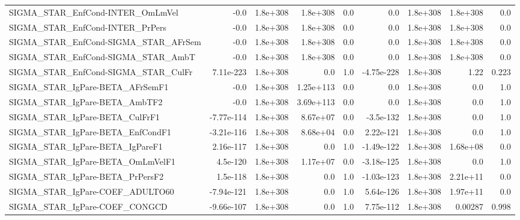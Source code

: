 \begin{tabular}{lrrrrrrrr}
SIGMA\_STAR\_EnfCond-INTER\_OmLmVel      &        -0.0 &     1.8e+308 &   1.8e+308 &      0.0 &        0.0 &    1.8e+308 &     1.8e+308 &           0.0 \\
SIGMA\_STAR\_EnfCond-INTER\_PrPers       &        -0.0 &     1.8e+308 &   1.8e+308 &      0.0 &        0.0 &    1.8e+308 &     1.8e+308 &           0.0 \\
SIGMA\_STAR\_EnfCond-SIGMA\_STAR\_AFrSem  &        -0.0 &     1.8e+308 &   1.8e+308 &      0.0 &        0.0 &    1.8e+308 &     1.8e+308 &           0.0 \\
SIGMA\_STAR\_EnfCond-SIGMA\_STAR\_AmbT    &        -0.0 &     1.8e+308 &   1.8e+308 &      0.0 &        0.0 &    1.8e+308 &     1.8e+308 &           0.0 \\
SIGMA\_STAR\_EnfCond-SIGMA\_STAR\_CulFr   &   7.11e-223 &     1.8e+308 &        0.0 &      1.0 & -4.75e-228 &    1.8e+308 &         1.22 &         0.223 \\
SIGMA\_STAR\_IgPare-BETA\_AFrSemF1       &        -0.0 &     1.8e+308 &  1.25e+113 &      0.0 &        0.0 &    1.8e+308 &          0.0 &           1.0 \\
SIGMA\_STAR\_IgPare-BETA\_AmbTF2         &        -0.0 &     1.8e+308 &  3.69e+113 &      0.0 &        0.0 &    1.8e+308 &          0.0 &           1.0 \\
SIGMA\_STAR\_IgPare-BETA\_CulFrF1        &  -7.77e-114 &     1.8e+308 &   8.67e+07 &      0.0 &  -3.5e-132 &    1.8e+308 &          0.0 &           1.0 \\
SIGMA\_STAR\_IgPare-BETA\_EnfCondF1      &  -3.21e-116 &     1.8e+308 &   8.68e+04 &      0.0 &  2.22e-121 &    1.8e+308 &          0.0 &           1.0 \\
SIGMA\_STAR\_IgPare-BETA\_IgPareF1       &   2.16e-117 &     1.8e+308 &        0.0 &      1.0 & -1.49e-122 &    1.8e+308 &     1.68e+08 &           0.0 \\
SIGMA\_STAR\_IgPare-BETA\_OmLmVelF1      &    4.5e-120 &     1.8e+308 &   1.17e+07 &      0.0 & -3.18e-125 &    1.8e+308 &          0.0 &           1.0 \\
SIGMA\_STAR\_IgPare-BETA\_PrPersF2       &    1.5e-118 &     1.8e+308 &        0.0 &      1.0 & -1.03e-123 &    1.8e+308 &     2.21e+11 &           0.0 \\
SIGMA\_STAR\_IgPare-COEF\_ADULTO60       &  -7.94e-121 &     1.8e+308 &        0.0 &      1.0 &  5.64e-126 &    1.8e+308 &     1.97e+11 &           0.0 \\
SIGMA\_STAR\_IgPare-COEF\_CONGCD         &  -9.66e-107 &     1.8e+308 &        0.0 &      1.0 &  7.75e-112 &    1.8e+308 &      0.00287 &         0.998 \\

\end{tabular}
